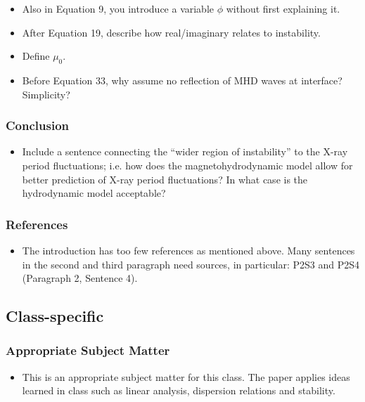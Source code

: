 \documentclass[10pt,letterpaper]{article}
\begin{document}
\begin{itemize}
\begin{itemize}
						\item Also in Equation 9, you introduce a variable $\phi$ without first explaining it.
						
						\item After Equation 19, describe how real/imaginary relates to instability.
						
						\item Define $\mu_0$.
						
						\item Before Equation 33, why assume no reflection of MHD waves at interface? Simplicity?
						
					\end{itemize}
				\end{itemize}
			
			\subsubsection{Conclusion}
			
				\begin{itemize}
					\item Include a sentence connecting the ``wider region of instability'' to the X-ray period fluctuations; i.e. how does the magnetohydrodynamic model allow for better prediction of X-ray period fluctuations? In what case is the hydrodynamic model acceptable?
				\end{itemize}
			
			\subsubsection{References}
			
				\begin{itemize}
					\item The introduction has too few references as mentioned above. 
					Many sentences in the second and third paragraph need sources, in particular: P2S3 and P2S4 (Paragraph 2, Sentence 4).
				\end{itemize}
			
		\subsection{Class-specific}
			\subsubsection{Appropriate Subject Matter}
			
				\begin{itemize}
					\item This is an appropriate subject matter for this class. 
					The paper applies ideas learned in class such as linear analysis, dispersion relations and stability. 
				\end{itemize}
			
\end{document}

